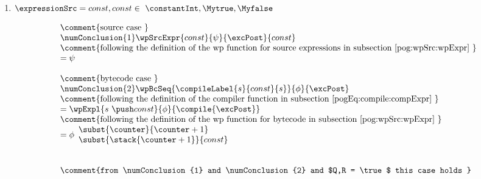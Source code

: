 \begin{enumerate} 
		\item    $\expressionSrc = const , const \in \ \constantInt, \Mytrue, \Myfalse $
                     
		     $$ \begin{array}{l}  
		               \mbox{\rm\comment{source case }} \\
		              \numConclusion{1} \wpSrcExpr{ const}{\psi}{ \excPost}{const}  \\
		    	       \mbox{\rm\comment{following the definition of the wp function for source expressions in subsection  \ref{pog:wpSrc:wpExpr} }} \\
			       = \psi \\
			       \\
			       \mbox{\rm\comment{bytecode case }} \\
		               \numConclusion{2} \wpBcSeq{\compileLabel{s}{const}{s} }{\phi}{ \excPost}  \\
			
		    	       \mbox{\rm\comment{following the definition   of the compiler function in subsection \ref{pogEq:compile:compExpr} }} \\
			       = \wpExpl{s \ \push const }{\phi}{ \compile{\excPost}}  \\
			       \mbox{\rm\comment{following the definition of the wp function for bytecode in subsection \ref{pog:wpSrc:wpExpr}  }} \\
			       = \phi \begin{array}{l}
                                                \subst{ \counter }{ \counter + 1}\\
						\subst{\stack{ \counter +1} }{const  }
					    \end{array} \\
			        \\
				\\
				 \mbox{\rm\comment{from \numConclusion{1} and   \numConclusion{2} and $Q,R = \true $ this case holds   }} \\
					 
				    
			\end{array}$$
                        
			
			

\end{enumerate}
